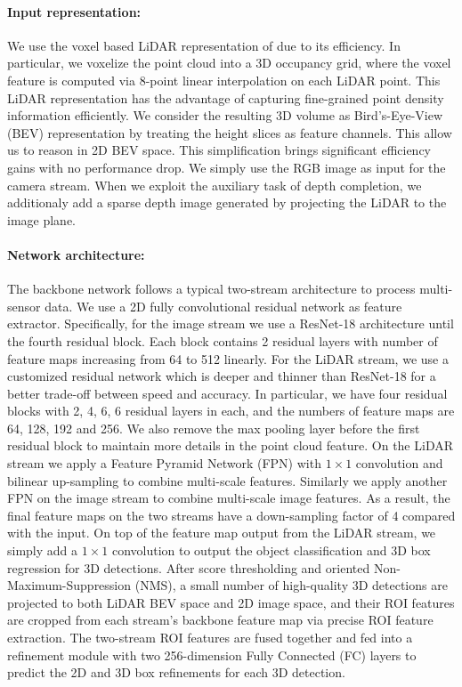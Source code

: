 \documentclass[10pt,twocolumn,letterpaper]{article}
\begin{document}
\paragraph{Input representation:}
We use the voxel based LiDAR representation of \cite{contfuse} due to its efficiency. In particular, we voxelize the point cloud into a 3D occupancy grid, where the voxel feature is computed via 8-point linear interpolation on each LiDAR point. This LiDAR representation has the advantage of capturing fine-grained point density information efficiently. We consider the resulting 3D volume as Bird's-Eye-View (BEV) representation by treating the height slices as feature channels. This allow us to reason   in  2D BEV space. This simplification brings significant efficiency gains with no performance drop.
We simply use the RGB  image as input for the camera stream. When we exploit the auxiliary task of depth completion, we additionaly add a sparse depth image generated by projecting the LiDAR to the image plane.

\paragraph{Network architecture:}
The backbone network follows a typical two-stream architecture to process multi-sensor data. We use a 2D fully  convolutional residual network \cite{resnet} as feature extractor. Specifically, for the image stream we use a ResNet-18 \cite{resnet} architecture until the fourth residual block. Each block contains 2 residual layers with number of feature maps increasing from 64 to 512 linearly. For the LiDAR stream, we use a customized residual network which is deeper and thinner than ResNet-18 for a better trade-off between speed and accuracy. In particular, we have four residual blocks with 2, 4, 6, 6 residual layers in each, and the numbers of feature maps are 64, 128, 192 and 256. We also remove the max pooling layer before the first residual block to maintain more details in the point cloud feature. On the LiDAR stream we apply a Feature Pyramid Network (FPN) \cite{fpn} with $1\times1$ convolution and bilinear up-sampling to combine multi-scale features. Similarly we apply another FPN on the image stream  to combine multi-scale image features. 
As a result, the final feature maps on the two streams have a down-sampling factor of 4 compared with the input. On top of the feature map output from the LiDAR stream, we simply add a $1\times1$ convolution to output the object classification and 3D box regression for 3D detections. After score thresholding and oriented Non-Maximum-Suppression (NMS), a small number of high-quality 3D detections are projected to both LiDAR BEV space and 2D image space, and their ROI features are cropped from each stream's backbone feature map via precise ROI feature extraction. The two-stream ROI features are fused together and fed into a refinement module with two 256-dimension Fully Connected (FC) layers to predict the 2D and 3D box refinements for each 3D detection.
\end{document}
